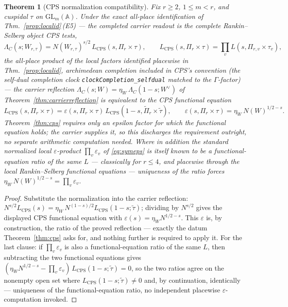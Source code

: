 \documentclass[11pt]{article}
\newtheorem{theorem}{Theorem}
\theoremstyle{definition}
\begin{document}
\begin{theorem}[CPS normalization compatibility]\label{thm:cpsnorm}
Fix $r\ge2$, $1\le m<r$, and cuspidal $\tau$ on $\mathrm{GL}_m(\mathbb A)$. Under the exact all-place
identification of Thm.~\ref{prop:localid}\,\textup{(E5)} --- the completed carrier readout \emph{is} the
complete Rankin--Selberg object CPS tests,
\[
  \Lambda_C(s;W_{r,\tau})=N(W_{r,\tau})^{s/2}\,L_{\mathrm{CPS}}(s,\Pi_r\times\tau),\qquad
  L_{\mathrm{CPS}}(s,\Pi_r\times\tau)=\prod_v L(s,\Pi_{r,v}\times\tau_v),
\]
the all-place product of the local factors identified placewise in Thm.~\ref{prop:localid}, archimedean
completion included in CPS's convention (the self-dual completion clock
\texttt{clockCompletion\_selfdual} matched to the $\Gamma$-factor) --- the carrier reflection
$\Lambda_C(s;W)=\eta_W\,\Lambda_C(1-s;W^\vee)$ of Theorem~\ref{thm:carrierreflection} is \emph{equivalent} to the
CPS functional equation
\[
  L_{\mathrm{CPS}}(s,\Pi_r\times\tau)=\varepsilon(s,\Pi_r\times\tau)\,
  L_{\mathrm{CPS}}(1-s,\widetilde\Pi_r\times\widetilde\tau),\qquad
  \varepsilon(s,\Pi_r\times\tau)=\eta_W\,N(W)^{1/2-s}.
\]
Theorem~\ref{thm:cps} requires only \emph{an} epsilon factor for which the functional equation holds; the
carrier supplies it, so this discharges the requirement outright, no separate arithmetic computation needed.
Where in addition the standard normalized local $\varepsilon$-product $\prod_v\varepsilon_v$ of
\eqref{eq:symeps} is itself known to be a functional-equation ratio of the same $L$ --- classically for
$r\le4$, and placewise through the local Rankin--Selberg functional equations --- uniqueness of the ratio
forces $\eta_W\,N(W)^{1/2-s}=\prod_v\varepsilon_v$.
\end{theorem}
\begin{proof}
Substitute the normalization into the carrier reflection:
$N^{s/2}L_{\mathrm{CPS}}(s)=\eta_W\,N^{(1-s)/2}L_{\mathrm{CPS}}(1-s;\widetilde\tau)$; dividing by $N^{s/2}$
gives the displayed CPS functional equation with $\varepsilon(s)=\eta_W N^{1/2-s}$. This $\varepsilon$ is,
by construction, the ratio of the proved reflection --- exactly the datum Theorem~\ref{thm:cps} asks for,
and nothing further is required to apply it. For the last clause: if $\prod_v\varepsilon_v$ is also a
functional-equation ratio of the same $L$, then subtracting the two functional equations gives
$(\eta_W N^{1/2-s}-\prod_v\varepsilon_v)\,L_{\mathrm{CPS}}(1-s;\widetilde\tau)=0$, so the two ratios agree on
the nonempty open set where $L_{\mathrm{CPS}}(1-s;\widetilde\tau)\ne0$ and, by continuation, identically ---
uniqueness of the functional-equation ratio, no independent placewise $\varepsilon$-computation invoked.
\end{proof}
\end{document}
